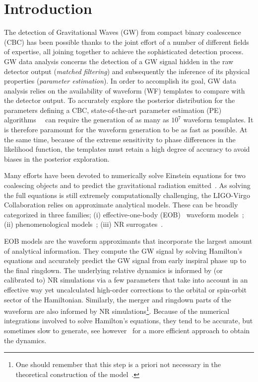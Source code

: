 \section{Introduction}
The detection of Gravitational Waves (GW) from compact binary coalescence (CBC) has been possible thanks to the joint effort of a number of different fields of expertise, all joining together to achieve the sophisticated detection process. GW data analysis concerns the detection of a GW signal hidden in the raw detector output (\textit{matched filtering}) and subsequently the inference of its physical properties (\textit{parameter estimation}). In order to accomplish its goal, GW data analysis relies on the availability of waveform (WF) templates to compare with the detector output.
To accurately explore the posterior distribution for the parameters defining a CBC, state-of-the-art parameter estimation (PE) algorithms~\cite{Aasi:2013jjl}~\cite{Veitch2014wba} can require the generation of as many as $10^7$ waveform templates. It is therefore paramount for the waveform generation to be as fast as possible. At the same time, because of the extreme sensitivity to phase differences in the likelihood  function, 
the templates must retain a high degree of accuracy to avoid biases in the posterior exploration.

Many efforts have been devoted to numerically solve Einstein equations for two coalescing objects and 
to predict the gravitational radiation emitted~\cite{Boyle:2019kee,Healy:2019jyf,Healy:2020vre}.
As solving the full equations is still extremely computationally challenging, the LIGO-Virgo Collaboration 
relies on approximate analytical models. 
These can be broadly categorized in  three families; (i) effective-one-body (EOB)~\cite{Buonanno:2000ef} 
waveform models~\cite{Damour:2009kr,Nagar:2020pcj,Chiaramello:2020ehz,Ossokine:2020kjp}; (ii) phenomenological 
models~\cite{Khan:2015jqa,Pratten:2020ceb,Estelles:2020osj}; (iii) NR surrogates~\cite{Varma:2018mmi,Williams:2019vub,Varma:2019csw,Rifat:2019ltp,Khan:2020fso}.

EOB models are the waveform approximants that incorporate the largest amount of analytical information.
They compute the GW signal by solving Hamilton's equations  and accurately predict the 
GW signal from early inspiral phase up to the final ringdown. The underlying relative dynamics
is informed by (or calibrated to) NR simulations via a few parameters that take into account 
in an effective way yet uncalculated high-order corrections to the orbital or spin-orbit sector 
of the Hamiltonian. Similarly, the merger and ringdown parts of the waveform are also informed by NR 
simulations\footnote{One should remember that this step is a priori not necessary in the theoretical 
construction of the model~\cite{Buonanno:2000ef,Damour:2007xr,Damour:2009wj}.}.
Because of the numerical integrations involved to solve Hamilton's equations, they tend to 
be accurate, but sometimes slow to generate, see however~\cite{Nagar:2018gnk} for a 
more efficient approach to obtain the dynamics.

